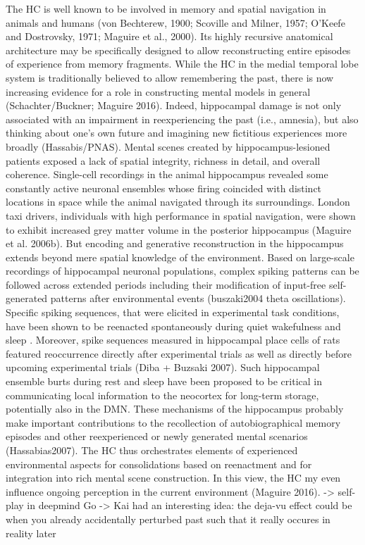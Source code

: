 \documentclass{article} %
\begin{document}
The HC is well known to be involved in memory and
spatial navigation in animals and humans
(von Bechterew, 1900; Scoville and Milner, 1957; O’Keefe and Dostrovsky, 1971; Maguire et al., 2000).
Its highly recursive anatomical architecture
may be specifically designed to allow reconstructing
entire episodes of experience from memory fragments.
%
While the HC in the medial temporal lobe system
is traditionally believed to allow remembering the past,
there is now increasing evidence for a role
in constructing mental models in general (Schachter/Buckner;
Maguire 2016).
Indeed,
hippocampal damage is
not only associated with an impairment in reexperiencing the past (i.e., amnesia),
but also thinking about one’s own future and
imagining new fictitious experiences more broadly (Hassabis/PNAS).
Mental scenes created by hippocampus-lesioned patients exposed a lack of
spatial integrity, richness in detail, and overall coherence.
%
Single-cell recordings in the animal hippocampus revealed
some constantly active neuronal ensembles whose firing coincided with
distinct locations in space while the animal navigated through its surroundings.
London taxi drivers, individuals with high performance in spatial navigation,
were shown to exhibit increased grey matter volume in the
posterior hippocampus (Maguire et al. 2006b).
But encoding and generative reconstruction in the hippocampus extends
beyond mere spatial knowledge of the environment.
Based on large-scale recordings of hippocampal neuronal populations,
complex spiking patterns can be followed across extended periods including
their modification of input-free self-generated patterns
after environmental events (buszaki2004 theta oscillations).
Specific spiking sequences, that were elicited in experimental task conditions,
have been shown to be reenacted spontaneously during
quiet wakefulness and sleep \cite{hartley2014space}.
Moreover, spike sequences measured in hippocampal place cells of rats
featured reoccurrence directly after experimental trials
as well as directly before upcoming experimental trials (Diba + Buzsaki 2007).
Such hippocampal ensemble burts during rest and sleep
have been proposed to be critical in communicating local information
to the neocortex for long-term storage, potentially also in the DMN.
These mechanisms of the hippocampus probably make important contributions to the
recollection of autobiographical memory episodes and other
reexperienced or newly generated mental scenarios (Hassabias2007).
%
The HC thus orchestrates elements of experienced environmental aspects for
consolidations based on reenactment and for integration into 
rich mental scene construction. In this view, the HC my even influence
ongoing perception in the current environment (Maguire 2016).
-> self-play in deepmind Go
-> Kai had an interesting idea: the deja-vu effect could be when you already accidentally perturbed past such that it really occures in reality later
\end{document}
